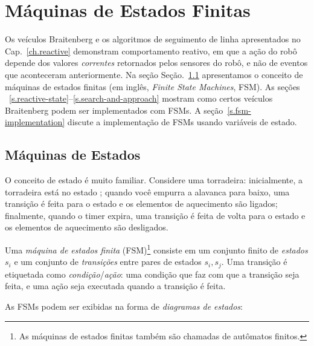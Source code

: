 
\chapter{Máquinas de Estados Finitas}\label{ch.fmg}

Os veículos Braitenberg e os algoritmos de seguimento de linha apresentados no Cap.~\ref{ch.reactive} demonstram comportamento reativo, em que a ação do robô depende dos valores \emph{correntes} retornados pelos sensores do robô, e não de eventos que aconteceram anteriormente. Na seção Seção.~\ref{s.sm} apresentamos o conceito de máquinas de estados finitas (em inglês, \emph{Finite State Machines}, FSM). As seções ~\ref{s.reactive-state}--\ref{s.search-and-approach} mostram como certos veículos Braitenberg podem ser implementados com FSMs. A seção~\ref{s.fsm-implementation} discute a implementação de FSMs usando variáveis de estado.

\section{Máquinas de Estados}\label{s.sm}

O conceito de estado é muito familiar. Considere uma torradeira: inicialmente, a torradeira está no estado ; quando você empurra a alavanca para baixo, uma transição é feita para o estado  e os elementos de aquecimento são ligados; finalmente, quando o timer expira, uma transição é feita de volta para o estado  e os elementos de aquecimento são desligados.

Uma \emph{máquina de estados finita} (FSM)\footnote{As máquinas de estados finitas também são chamadas de autômatos finitos.} consiste em um conjunto finito de \emph{estados} $s_i$ e um conjunto de \emph{transições} entre pares de estados $s_i, s_j$. Uma transição é etiquetada como \textit{condição}/\textit{ação}: uma condição que faz com que a transição seja feita, e uma ação seja executada quando a transição é feita.

As FSMs podem ser exibidas na forma de \emph{diagramas de estados}:
\begin{center}
\end{center}

